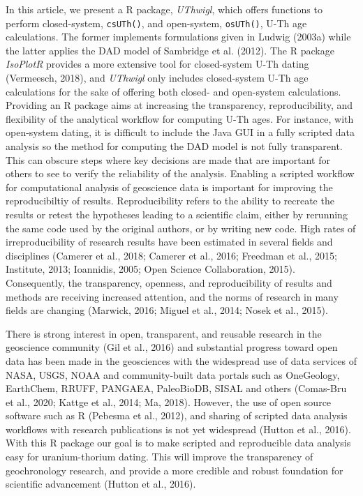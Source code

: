 \documentclass[]{elsarticle} %
\begin{document}
In this article, we present a R package, \emph{UThwigl}, which offers functions to perform closed-system, \texttt{csUTh()}, and open-system, \texttt{osUTh()}, U-Th age calculations. The former implements formulations given in Ludwig (2003a) while the latter applies the DAD model of Sambridge et al. (2012). The R package \emph{IsoPlotR} provides a more extensive tool for closed-system U-Th dating (Vermeesch, 2018), and \emph{UThwigl} only includes closed-system U-Th age calculations for the sake of offering both closed- and open-system calculations.\\
Providing an R package aims at increasing the transparency, reproducibility, and flexibility of the analytical workflow for computing U-Th ages. For instance, with open-system dating, it is difficult to include the Java GUI in a fully scripted data analysis so the method for computing the DAD model is not fully transparent. This can obscure steps where key decisions are made that are important for others to see to verify the reliability of the analysis. Enabling a scripted workflow for computational analysis of geoscience data is important for improving the reproducibiltiy of results. Reproducibility refers to the ability to recreate the results or retest the hypotheses leading to a scientific claim, either by rerunning the same code used by the original authors, or by writing new code. High rates of irreproducibility of research results have been estimated in several fields and disciplines (Camerer et al., 2018; Camerer et al., 2016; Freedman et al., 2015; Institute, 2013; Ioannidis, 2005; Open Science Collaboration, 2015). Consequently, the transparency, openness, and reproducibility of results and methods are receiving increased attention, and the norms of research in many fields are changing (Marwick, 2016; Miguel et al., 2014; Nosek et al., 2015).

There is strong interest in open, transparent, and reusable research in the geoscience community (Gil et al., 2016) and substantial progress toward open data has been made in the geosciences with the widespread use of data services of NASA, USGS, NOAA and community-built data portals such as OneGeology, EarthChem, RRUFF, PANGAEA, PaleoBioDB, SISAL and others (Comas-Bru et al., 2020; Kattge et al., 2014; Ma, 2018). However, the use of open source software such as R (Pebesma et al., 2012), and sharing of scripted data analysis workflows with research publications is not yet widespread (Hutton et al., 2016). With this R package our goal is to make scripted and reproducible data analysis easy for uranium-thorium dating. This will improve the transparency of geochronology research, and provide a more credible and robust foundation for scientific advancement (Hutton et al., 2016).
\end{document}
